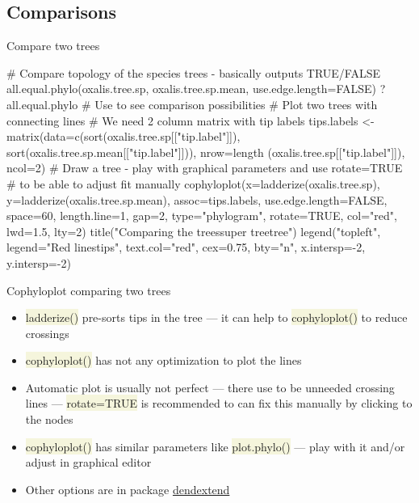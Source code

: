 \documentclass[compress, ucs, xelatex, 11pt, xcolor=svgnames, aspectratio=169,
	hyperref={
		bookmarks=true,
		unicode=true,
		colorlinks=true,
		pdftitle={Molecular data in R},
		plainpages=false,
		pdfauthor={Vojtech Zeisek},
		pdfsubject={Course about phylogeny and evolution in R},
		pdfcreator={XeLaTeX},
		pdfkeywords={R, evolution, phylogeny, molecular data},
		linkcolor=Crimson, %
		anchorcolor=Magenta, %
		citecolor=Magenta, %
		filecolor=Magenta, %
		menucolor=Magenta, %
		urlcolor=DodgerBlue, %
		pdftex},
	url={hyphens, lowtilde} %
	]{beamer}
\renewcommand{\texttt}[1]{\colorbox{Beige}{{\ttfamily #1}}}
\begin{document}
\subsection{Comparisons}

\begin{frame}[fragile]{Compare two trees}
	\begin{spluscode}
    # Compare topology of the species trees - basically outputs TRUE/FALSE
    all.equal.phylo(oxalis.tree.sp, oxalis.tree.sp.mean, use.edge.length=FALSE)
    ?all.equal.phylo # Use to see comparison possibilities
    # Plot two trees with connecting lines
    # We need 2 column matrix with tip labels
    tips.labels <- matrix(data=c(sort(oxalis.tree.sp[["tip.label"]]),
      sort(oxalis.tree.sp.mean[["tip.label"]])), nrow=length
      (oxalis.tree.sp[["tip.label"]]), ncol=2)
    # Draw a tree - play with graphical parameters and use rotate=TRUE
    # to be able to adjust fit manually
    cophyloplot(x=ladderize(oxalis.tree.sp), y=ladderize(oxalis.tree.sp.mean),
      assoc=tips.labels, use.edge.length=FALSE, space=60, length.line=1, gap=2,
      type="phylogram", rotate=TRUE, col="red", lwd=1.5, lty=2)
    title("Comparing the trees\nParsimony super tree\tSpecies tree")
    legend("topleft", legend="Red lines\nconnect tips", text.col="red",
      cex=0.75, bty="n", x.intersp=-2, y.intersp=-2)
	\end{spluscode}
\end{frame}

\begin{frame}{Cophyloplot comparing two trees}
	\begin{multicols}{2}
		\begin{center}
			\texttt{[image: cophyloplot.png]}
		\end{center}
		\begin{itemize}
			\item \texttt{ladderize()} pre-sorts tips in the tree --- it can help to \texttt{cophyloplot()} to reduce crossings
			\item \texttt{cophyloplot()} has not any optimization to plot the lines
			\item Automatic plot is usually not perfect --- there use to be unneeded crossing lines --- \texttt{rotate=TRUE} is recommended to can fix this manually by clicking to the nodes
			\item \texttt{cophyloplot()} has similar parameters like \texttt{plot.phylo()} --- play with it and/or adjust in graphical editor
			\item Other options are in package \href{https://CRAN.R-project.org/package=dendextend}{dendextend}
		\end{itemize}
	\end{multicols}
\end{frame}
\end{document}
